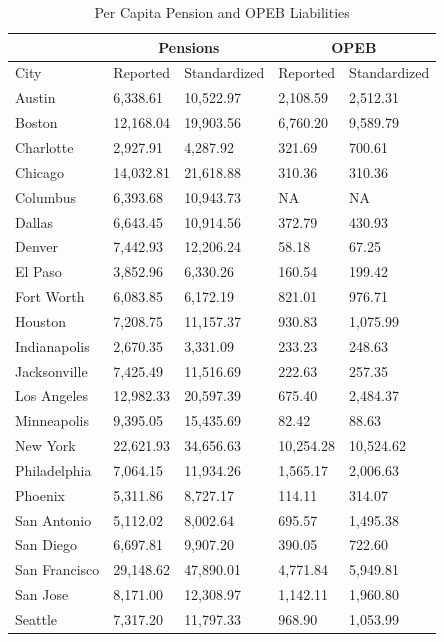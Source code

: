 \documentclass[12pt]{article}
\begin{document}
\begin{table}[h]
\centering
\caption{Per Capita Pension and OPEB Liabilities}
\begin{tabular}{l|l|l|l|l}
\hline
& \multicolumn{2}{c}{Pensions} & \multicolumn{2}{c}{OPEB} \\
\hline
City &  Reported &  Standardized &  Reported &  Standardized\\
\hline
Austin & 6,338.61 & 10,522.97 & 2,108.59 & 2,512.31\\
\hline
Boston & 12,168.04 & 19,903.56 & 6,760.20 & 9,589.79\\
\hline
Charlotte & 2,927.91 & 4,287.92 & 321.69 & 700.61\\
\hline
Chicago & 14,032.81 & 21,618.88 & 310.36 & 310.36\\
\hline
Columbus & 6,393.68 & 10,943.73 & NA & NA\\
\hline
Dallas & 6,643.45 & 10,914.56 & 372.79 & 430.93\\
\hline
Denver & 7,442.93 & 12,206.24 & 58.18 & 67.25\\
\hline
El Paso & 3,852.96 & 6,330.26 & 160.54 & 199.42\\
\hline
Fort Worth & 6,083.85 & 6,172.19 & 821.01 & 976.71\\
\hline
Houston & 7,208.75 & 11,157.37 & 930.83 & 1,075.99\\
\hline
Indianapolis & 2,670.35 & 3,331.09 & 233.23 & 248.63\\
\hline
Jacksonville & 7,425.49 & 11,516.69 & 222.63 & 257.35\\
\hline
Los Angeles & 12,982.33 & 20,597.39 & 675.40 & 2,484.37\\
\hline
Minneapolis & 9,395.05 & 15,435.69 & 82.42 & 88.63\\
\hline
New York & 22,621.93 & 34,656.63 & 10,254.28 & 10,524.62\\
\hline
Philadelphia & 7,064.15 & 11,934.26 & 1,565.17 & 2,006.63\\
\hline
Phoenix & 5,311.86 & 8,727.17 & 114.11 & 314.07\\
\hline
San Antonio & 5,112.02 & 8,002.64 & 695.57 & 1,495.38\\
\hline
San Diego & 6,697.81 & 9,907.20 & 390.05 & 722.60\\
\hline
San Francisco & 29,148.62 & 47,890.01 & 4,771.84 & 5,949.81\\
\hline
San Jose & 8,171.00 & 12,308.97 & 1,142.11 & 1,960.80\\
\hline
Seattle & 7,317.20 & 11,797.33 & 968.90 & 1,053.99\\
\hline
\end{tabular}
\end{table}
\end{document}
